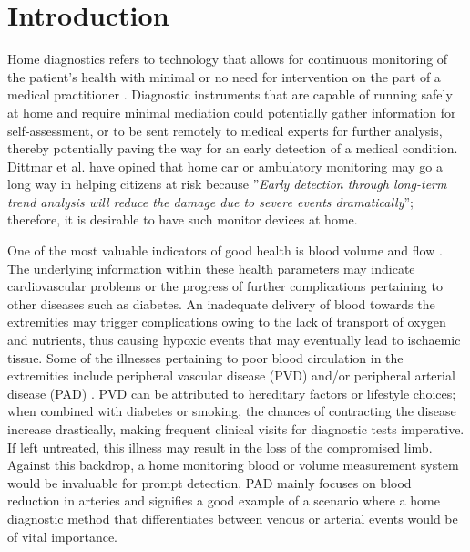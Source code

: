 
\chapter{Introduction}  %

\ifpdf
    \graphicspath{{Chapter1/Figs/Raster/}{Chapter1/Figs/PDF/}{Chapter1/Figs/}}
\else
    \graphicspath{{Chapter1/Figs/Vector/}{Chapter1/Figs/}}
\fi

Home diagnostics refers to technology that allows for continuous monitoring of the patient's health with minimal or no need for intervention on the part of a medical practitioner \cite{dittmar2004new}. Diagnostic instruments that are capable of running safely at home and require minimal mediation could potentially gather information for self-assessment, or to be sent remotely to medical experts for further analysis, thereby potentially paving the way for an early detection of a medical condition. Dittmar et al. \cite{dittmar2004new} have opined that home car or ambulatory monitoring may go a long way in helping citizens at risk because ''\textit{Early detection through long-term trend analysis will reduce the damage due to severe events dramatically}''; therefore, it is desirable to have such monitor devices at home.

One of the most valuable indicators of good health is blood volume and flow \cite{bloodcirculation}. The underlying information within these health parameters may indicate cardiovascular problems or the progress of further complications pertaining to other diseases such as diabetes. An inadequate delivery of blood towards the extremities may trigger complications owing to the lack of transport of oxygen and nutrients, thus causing hypoxic events that may eventually lead to ischaemic tissue. Some of the illnesses pertaining to poor blood circulation in the extremities include peripheral vascular disease (PVD) and/or peripheral arterial disease (PAD) \cite{novo2004critical}. PVD can be attributed to hereditary factors or lifestyle choices; when combined with diabetes or smoking, the chances of contracting the disease increase drastically, making frequent clinical visits for diagnostic tests imperative. If left untreated, this illness may result in the loss of the compromised limb. Against this backdrop, a home monitoring blood or volume measurement system would be invaluable for prompt detection. PAD mainly focuses on blood reduction in arteries and signifies a good example of a scenario where a home diagnostic method that differentiates between venous or arterial events would be of vital importance. 

